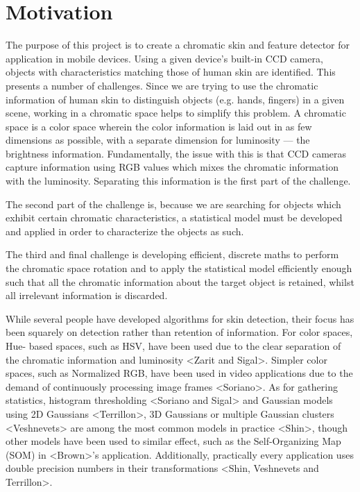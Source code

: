 
\chapter{Motivation}  %

\ifpdf
    \graphicspath{{Chapter1/Figs/Raster/}{Chapter1/Figs/PDF/}{Chapter1/Figs/}}
\else
    \graphicspath{{Chapter1/Figs/Vector/}{Chapter1/Figs/}}
\fi

The purpose of this project is to create a chromatic skin and feature detector for application in mobile devices. Using a given device's built-in CCD camera, objects with characteristics matching those of human skin are identified. This presents a number of challenges. Since we are trying to use the chromatic information of human skin to distinguish objects (e.g. hands, fingers) in a given scene, working in a chromatic space helps to simplify this problem. A chromatic space is a color space wherein the color information is laid out in as few dimensions as possible, with a separate dimension for luminosity --- the brightness information. Fundamentally, the issue with this is that CCD cameras capture information using RGB values which mixes the chromatic information with the luminosity. Separating this information is the first part of the challenge.

The second part of the challenge is, because we are searching for objects which exhibit certain chromatic characteristics, a statistical model must be developed and applied in order to characterize the objects as such.

The third and final challenge is developing efficient, discrete maths to perform the chromatic space rotation and to apply the statistical model efficiently enough such that all the chromatic information about the target object is retained, whilst all irrelevant information is discarded.

While several people have developed algorithms for skin detection, their focus has been squarely on detection rather than retention of information. For color spaces, Hue- based spaces, such as HSV, have been used due to the clear separation of the chromatic information and luminosity <Zarit and Sigal>. Simpler color spaces, such as Normalized RGB, have been used in video applications due to the demand of continuously processing image frames <Soriano>. As for gathering statistics, histogram thresholding <Soriano and Sigal> and Gaussian models using 2D Gaussians <Terrillon>, 3D Gaussians or multiple Gaussian clusters <Veshnevets> are among the most common models in practice <Shin>, though other models have been used to similar effect, such as the Self-Organizing Map (SOM) in <Brown>'s application. Additionally, practically every application uses double precision numbers in their transformations <Shin, Veshnevets and Terrillon>.

